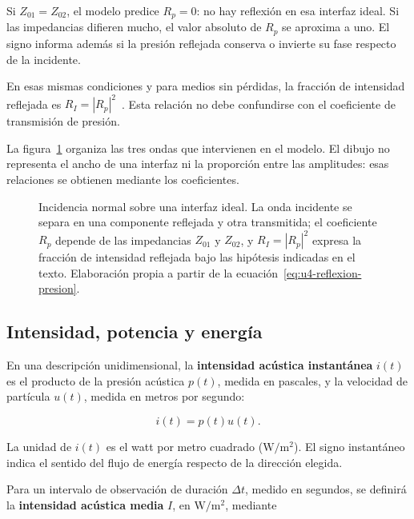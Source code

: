 Si \(Z_{01}=Z_{02}\), el modelo predice \(R_p=0\): no hay reflexión en esa
interfaz ideal. Si las impedancias difieren mucho, el valor absoluto de
\(R_p\) se aproxima a uno. El signo informa además si la presión reflejada
conserva o invierte su fase respecto de la incidente.

En esas mismas condiciones y para medios sin pérdidas, la fracción de
intensidad reflejada es \(R_I=|R_p|^2\)~\cite{xiangBlauert2021}. Esta relación no debe confundirse con
el coeficiente de transmisión de presión.

La figura~\ref{fig:u4-impedancia-reflexion} organiza las tres ondas que
intervienen en el modelo. El dibujo no representa el ancho de una interfaz ni
la proporción entre las amplitudes: esas relaciones se obtienen mediante los
coeficientes.

\begin{figure}[htbp]
    \centering
    
    \caption{Incidencia normal sobre una interfaz ideal. La onda incidente se
    separa en una componente reflejada y otra transmitida; el coeficiente
    \(R_p\) depende de las impedancias \(Z_{01}\) y \(Z_{02}\), y
    \(R_I=|R_p|^2\) expresa la fracción de intensidad reflejada bajo las
    hipótesis indicadas en el texto. Elaboración propia a partir de la
    ecuación~\eqref{eq:u4-reflexion-presion}.}
    \label{fig:u4-impedancia-reflexion}
\end{figure}

\subsection{Intensidad, potencia y energía}
\label{sec:u4-intensidad-potencia}

En una descripción unidimensional, la \textbf{intensidad acústica instantánea}
\(i(t)\) es el producto de la presión acústica \(p(t)\), medida en pascales, y
la velocidad de partícula \(u(t)\), medida en metros por segundo:

\begin{equation}
    i(t)=p(t)u(t).
    \label{eq:u4-intensidad-instantanea}
\end{equation}

La unidad de \(i(t)\) es el watt por metro cuadrado
(\(\text{W}/\text{m}^2\)). El signo instantáneo indica el sentido del flujo de
energía respecto de la dirección elegida.

Para un intervalo de observación de duración \(\Delta t\), medido en segundos,
se definirá la \textbf{intensidad acústica media} \(I\), en
\(\text{W}/\text{m}^2\), mediante

